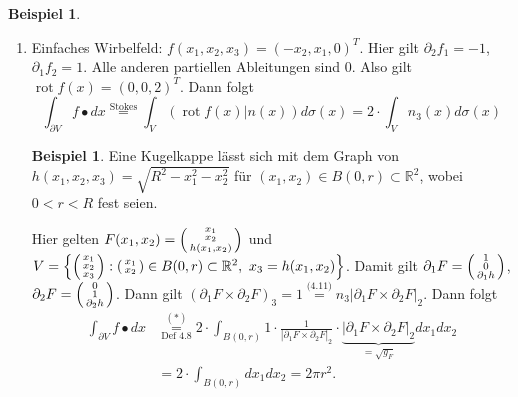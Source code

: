 \documentclass[a4paper]{report}
\newcommand{\R}{\mathbb{R}}
\newcommand{\overunderset}[3]{\overset{#1}{\underset{#3}{#2}}}
\newenvironment{jsmallmatrix}{\left( \begin{smallmatrix}}{\end{smallmatrix} \right)}
\newcommand{\jlabel}[1]{\label{j_#1}}
\newcommand{\jshortlink}[1]{\jhyperref{#1}{\text{#1}}}
\newcommand{\jhyperref}[2]{\hyperref[j_#1]{#2}}
\newcommand{\rot}{\mathop{\mathrm{{rot}}}}
\theoremstyle{plain}
\theoremstyle{definition}
\newtheorem{expl}[thm]{Beispiel}
\newtheorem*{expl*}{Beispiel}
\begin{document}
{{{{\begin{expl}
\begin{enumerate}
        \item 
            \jlabel{Bsp 4.23b)}
            Einfaches Wirbelfeld: $f(x_1, x_2, x_3) = (-x_2,x_1,0)^T$. Hier gilt $\partial_2 f_1 = -1$, $\partial_1 f_2 = 1$. Alle anderen partiellen Ableitungen sind $0$. Also gilt $\rot f(x) = (0,0,2)^T$. Dann folgt
            \[
                \tag{$*$}
                \int_{\partial V} f\bullet dx \overset{\jshortlink{Stokes}}{=} \int_V (\rot f(x)| n(x))d\sigma(x) = 2\cdot \int_V n_3(x) d\sigma(x)
            \]
            \begin{expl*}
                Eine Kugelkappe lässt sich mit dem Graph von $h(x_1,x_2,x_3) = \sqrt{R^2-x_1^2-x_2^2}$ für $(x_1,x_2)\in B(0,r) \subset \R^2$, wobei $0 < r < R$ fest seien.
            \end{expl*}
            Hier gelten $F(x_1,x_2) = \begin{jsmallmatrix}x_1\\ x_2 \\ h(x_1,x_2)\end{jsmallmatrix}$ und\\
            $V = \left\{\begin{jsmallmatrix}x_1\\x_2\\x_3\end{jsmallmatrix} : \begin{jsmallmatrix}x_1\\x_2\end{jsmallmatrix} \in B(0,r) \subset \R^2, \ x_3 = h(x_1,x_2) \right\}$. Damit gilt $\partial_1 F = \begin{jsmallmatrix}1\\0\\ \partial_1 h\end{jsmallmatrix}$, $\partial_2 F = \begin{jsmallmatrix}0\\1\\ \partial_2 h\end{jsmallmatrix}$. Dann gilt $(\partial_1 F \times \partial_2 F)_3 = 1 \overset{\jshortlink{(4.11)}}{=} n_3 |\partial_1 F \times \partial_2 F|_2$. Dann folgt
            \[
                \begin{split}
                    \int_{\partial V} f \bullet dx &\overunderset{(*)}{=}{\jshortlink{Def 4.8}} 2\cdot \int_{B(0,r)} 1\cdot \frac{1}{|\partial_1 F \times \partial_2 F|_2} \cdot \underbrace{|\partial_1 F \times \partial_2 F|_2}_{=\sqrt{g_F}} dx_1 dx_2\\
                    &= 2\cdot \int_{B(0,r)} dx_1 dx_2 = 2\pi r^2.
                \end{split}
            \]
    \end{enumerate}
\end{expl}
}}}}
\end{document}
